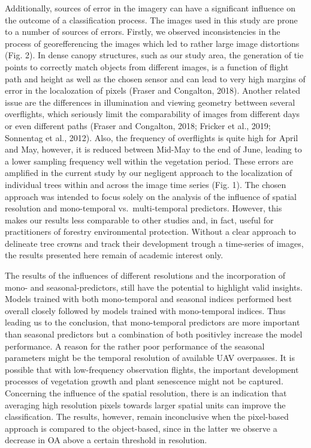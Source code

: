 \documentclass[]{article}
\begin{document}
Additionally, sources of error in the imagery can have a significant
influence on the outcome of a classification process. The images used in
this study are prone to a number of sources of errors. Firstly, we
observed inconsistencies in the process of georefferencing the images
which led to rather large image distortions (Fig. 2). In dense canopy
structures, such as our study area, the generation of tie points to
correctly match objects from different images, is a function of flight
path and height as well as the chosen sensor and can lead to very high
margins of error in the localozation of pixels (Fraser and Congalton,
2018). Another related issue are the differences in illumination and
viewing geometry bettween several overflights, which seriously limit the
comparability of images from different days or even different paths
(Fraser and Congalton, 2018; Fricker et al., 2019; Sonnentag et al.,
2012). Also, the frequency of overflights is quite high for April and
May, however, it is reduced between Mid-May to the end of June, leading
to a lower sampling frequency well within the vegetation period. These
errors are amplified in the current study by our negligent approach to
the localization of individual trees within and across the image time
series (Fig. 1). The chosen approach was intended to focus solely on the
analysis of the influence of spatial resolution and mono-temporal
vs.~multi-temporal predictors. However, this makes our results less
comparable to other studies and, in fact, useful for practitioners of
forestry environmental protection. Without a clear approach to delineate
tree crowns and track their development trough a time-series of images,
the results presented here remain of academic interest only.

The results of the influences of different resolutions and the
incorporation of mono- and seasonal-predictors, still have the potential
to highlight valid insights. Models trained with both mono-temporal and
seasonal indices performed best overall closely followed by models
trained with mono-temporal indices. Thus leading us to the conclusion,
that mono-temporal predictors are more important than seasonal
predictors but a combination of both positivley increase the model
performance. A reason for the rather poor performance of the seasonal
parameters might be the temporal resolution of available UAV overpasses.
It is possible that with low-frequency observation flights, the
important development processes of vegetation growth and plant
senescence might not be captured. Concerning the influence of the
spatial resolution, there is an indication that averaging high
resolution pixels towards larger spatial units can improve the
classification. The results, however, remain inconclusive when the
pixel-based approach is compared to the object-based, since in the
latter we observe a decrease in OA above a certain threshold in
resolution.
\end{document}

